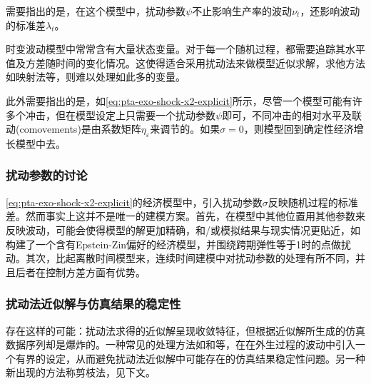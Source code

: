 需要指出的是，在这个模型中，扰动参数$\psi$不止影响生产率的波动$\nu_t$，还影响波动的标准差$\lambda_t$。

时变波动模型中常常含有大量状态变量。对于每一个随机过程，都需要追踪其水平值及方差随时间的变化情况。这使得适合采用扰动法来做模型近似求解，求他方法如映射法等，则难以处理如此多的变量。

此外需要指出的是，如\eqref{eq:pta-exo-shock-x2-explicit}所示，尽管一个模型可能有许多个冲击，但在模型设定上只需要一个扰动参数$\psi$即可，不同冲击的相对水平及联动(comovements)是由系数矩阵$\eta_{\varepsilon}$来调节的。如果$\sigma = 0$，则模型回到确定性经济增长模型中去。

\subsubsection{扰动参数的讨论}
\eqref{eq:pta-exo-shock-x2-explicit}的经济模型中，引入扰动参数$\sigma$反映随机过程的标准差。然而事实上这并不是唯一的建模方案。首先，在模型中其他位置用其他参数来反映波动，可能会使得模型的解更加精确，和/或模拟结果与现实情况更贴近，如\cite{Hansen:2008bh}构建了一个含有Epstein-Zin偏好的经济模型，并围绕跨期弹性等于1时的点做扰动。其次，比起离散时间模型来，连续时间建模中对扰动参数的处理有所不同，并且后者在控制方差方面有优势。

\subsubsection{扰动法近似解与仿真结果的稳定性}
存在这样的可能：扰动法求得的近似解呈现收敛特征，但根据近似解所生成的仿真数据序列却是爆炸的。一种常见的处理方法如\cite{Samuelson:1970fg}和\cite{Jin:2002HV}等，在在外生过程的波动中引入一个有界的设定，从而避免扰动法近似解中可能存在的仿真结果稳定性问题。另一种新出现的方法称剪枝法，见下文。

